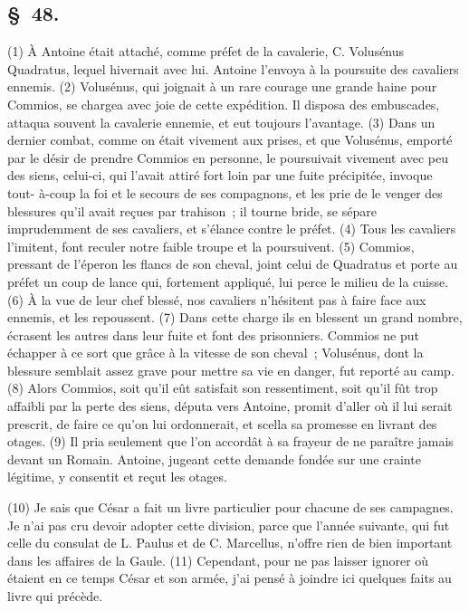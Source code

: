 \documentclass[french,twoside]{book} %
\begin{document}
\subsection[{§ 48.}]{ \textsc{§ 48.} }
\noindent (1) À Antoine était attaché, comme préfet de la cavalerie, C. Volusénus Quadratus, lequel hivernait avec lui. Antoine l’envoya à la poursuite des cavaliers ennemis. (2) Volusénus, qui joignait à un rare courage une grande haine pour Commios, se chargea avec joie de cette expédition. Il disposa des embuscades, attaqua souvent la cavalerie ennemie, et eut toujours l’avantage. (3) Dans un dernier combat, comme on était vivement aux prises, et que Volusénus, emporté par le désir de prendre Commios en personne, le poursuivait vivement avec peu des siens, celui-ci, qui l’avait attiré fort loin par une fuite précipitée, invoque tout- à-coup la foi et le secours de ses compagnons, et les prie de le venger des blessures qu’il avait reçues par trahison ; il tourne bride, se sépare imprudemment de ses cavaliers, et s’élance contre le préfet. (4) Tous les cavaliers l’imitent, font reculer notre faible troupe et la poursuivent. (5) Commios, pressant de l’éperon les flancs de son cheval, joint celui de Quadratus et porte au préfet un coup de lance qui, fortement appliqué, lui perce le milieu de la cuisse. (6) À la vue de leur chef blessé, nos cavaliers n’hésitent pas à faire face aux ennemis, et les repoussent. (7) Dans cette charge ils en blessent un grand nombre, écrasent les autres dans leur fuite et font des prisonniers. Commios ne put échapper à ce sort que grâce à la vitesse de son cheval ; Volusénus, dont la blessure semblait assez grave pour mettre sa vie en danger, fut reporté au camp. (8) Alors Commios, soit qu’il eût satisfait son ressentiment, soit qu’il fût trop affaibli par la perte des siens, députa vers Antoine, promit d’aller où il lui serait prescrit, de faire ce qu’on lui ordonnerait, et scella sa promesse en livrant des otages. (9) Il pria seulement que l’on accordât à sa frayeur de ne paraître jamais devant un Romain. Antoine, jugeant cette demande fondée sur une crainte légitime, y consentit et reçut les otages.\par
(10) Je sais que César a fait un livre particulier pour chacune de ses campagnes. Je n’ai pas cru devoir adopter cette division, parce que l’année suivante, qui fut celle du consulat de L. Paulus et de C. Marcellus, n’offre rien de bien important dans les affaires de la Gaule. (11) Cependant, pour ne pas laisser ignorer où étaient en ce temps César et son armée, j’ai pensé à joindre ici quelques faits au livre qui précède.
\end{document}
